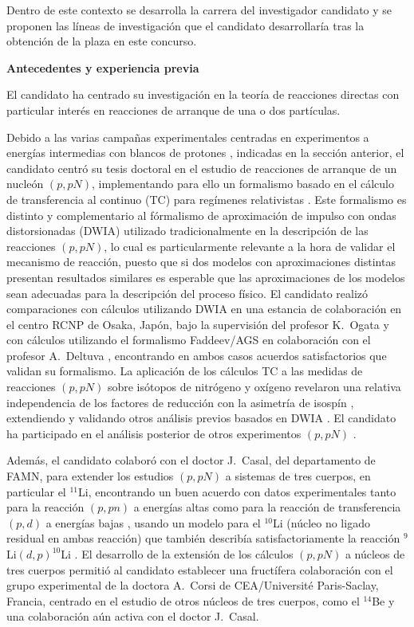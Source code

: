 \documentclass[a4paper,12pt,twoside]{article}
\begin{document}
Dentro de este contexto se desarrolla la carrera del investigador candidato y se proponen las líneas de investigación que el candidato desarrollaría tras la obtención de la plaza en este concurso.

\textbf{Antecedentes y experiencia previa}

El candidato ha centrado su investigación en la teoría de reacciones directas con particular interés en reacciones de arranque de una o dos partículas.

Debido a las varias campañas experimentales centradas en experimentos a energías intermedias con blancos de protones \cite{r3b07,Kaw18}, indicadas en la sección anterior, el candidato centró su tesis doctoral en el estudio de reacciones de arranque de un nucleón $(p,pN)$, implementando para ello un formalismo basado en el cálculo de transferencia al continuo (TC) para regímenes relativistas \cite{Mor15}. Este formalismo es distinto y complementario al fórmalismo de aproximación de impulso con ondas distorsionadas (DWIA) \cite{Jac66} utilizado tradicionalmente en la descripción de las reacciones $(p,pN)$, lo cual es particularmente relevante a la hora de validar el mecanismo de reacción, puesto que si dos modelos con aproximaciones distintas presentan resultados similares es esperable que las aproximaciones de los modelos sean adecuadas para la descripción del proceso físico. El candidato realizó comparaciones con cálculos utilizando DWIA en una estancia de colaboración en el centro RCNP de Osaka, Japón, bajo la supervisión del profesor K.~Ogata \cite{benchmarkdwia} y con cálculos utilizando el formalismo Faddeev/AGS \cite{Fad60, Alt67} en colaboración con el profesor A.~Deltuva \cite{benchmarkfaddeev}, encontrando en ambos casos acuerdos satisfactorios que validan su formalismo. La aplicación de los cálculos TC a las medidas de reacciones $(p,pN)$ sobre isótopos de nitrógeno y oxígeno revelaron una relativa independencia de los factores de reducción con la asimetría de isospín \cite{ppn}, extendiendo y validando otros análisis previos basados en DWIA \cite{Ata18}. El candidato ha participado en el análisis posterior de otros experimentos $(p,pN)$ \cite{thomas,49cl,49ar}.

Además, el candidato colaboró con el doctor J.~Casal, del departamento de FAMN, para extender los estudios $(p,pN)$ a sistemas de tres cuerpos, en particular el $^{11}$Li, encontrando un buen acuerdo con datos experimentales tanto para la reacción $(p,pn)$ a energías altas \cite{11lippn} como para la reacción de transferencia $(p,d)$ a energías bajas \cite{11lipd}, usando un modelo para el $^{10}$Li (núcleo no ligado residual en ambas reacción) que también describía satisfactoriamente la reacción $^9$Li$(d,p)^{10}$Li \cite{9lidp}. El desarrollo de la extensión de los cálculos $(p,pN)$ a núcleos de tres cuerpos permitió al candidato establecer una fructífera colaboración con el grupo experimental de la doctora A.~Corsi de CEA/Université Paris-Saclay, Francia, centrado en el estudio de otros núcleos de tres cuerpos, como el $^{14}$Be \cite{14be,openingangle} y una colaboración aún activa con el doctor J.~Casal.
\end{document}
